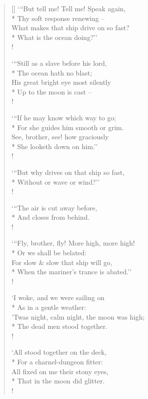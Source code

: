 \documentclass[MAIN]{subfiles}
\begin{document}
\begin{verse}[\versewidth]
`{``}But tell me! Tell me! Speak again,\\*
\vin Thy soft response renewing --\\
What makes that ship drive on so fast?\\*
\vin What is the ocean doing?''\\!

`{``}Still as a slave before his lord,\\*
\vin The ocean hath no blast;\\
His great bright eye most silently\\*
\vin Up to the moon is cast --\\!

`{``}If he may know which way to go;\\*
\vin For she guides him smooth or grim.\\
See, brother, see! how graciously\\*
\vin She looketh down on him.''\\!

`{``}But why drives on that ship so fast,\\*
\vin Without or wave or wind?''\\!

`{``}The air is cut away before,\\*
\vin And closes from behind.\\!

`{``}Fly, brother, fly! More high, more high!\\*
\vin Or we shall be belated:\\
For slow \& slow that ship will go,\\*
\vin When the mariner's trance is abated.''\\! 

`I woke, and we were sailing on\\*
\vin As in a gentle weather:\\
'Twas night, calm night, the moon was high;\\*
\vin The dead men stood together.\\!

`All stood together on the deck,\\*
\vin For a charnel-dungeon fitter:\\
All fixed on me their stony eyes,\\*
\vin That in the moon did glitter.\\!


\end{verse}
\end{document}
